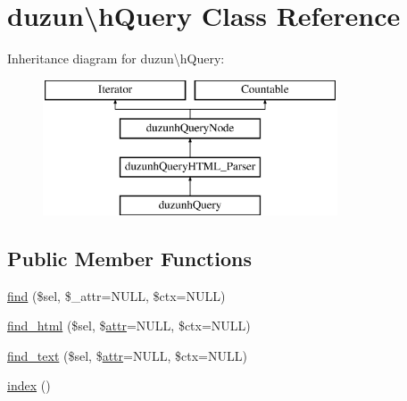 \hypertarget{classduzun_1_1hQuery}{}\section{duzun\textbackslash{}h\+Query Class Reference}
\label{classduzun_1_1hQuery}
Inheritance diagram for duzun\textbackslash{}h\+Query\+:\begin{figure}[H]
\begin{center}
\leavevmode
\includegraphics[height=4.000000cm]{classduzun_1_1hQuery}
\end{center}
\end{figure}
\subsection*{Public Member Functions}
\begin{DoxyCompactItemize}
\item 
\mbox{\hyperlink{classduzun_1_1hQuery_a3565bdeabc08bd32d10d365759e9dc82}{find}} (\$sel, \$\+\_\+attr=N\+U\+LL, \$ctx=N\+U\+LL)
\item 
\mbox{\hyperlink{classduzun_1_1hQuery_ac8332727e97405b17ecb4dd47c5a0fc9}{find\+\_\+html}} (\$sel, \$\mbox{\hyperlink{classduzun_1_1hQuery_1_1Node_a530ab9e8edeb1e876b369dcb321208c0}{attr}}=N\+U\+LL, \$ctx=N\+U\+LL)
\item 
\mbox{\hyperlink{classduzun_1_1hQuery_a3d00fababd6c54d00ee89a562233730d}{find\+\_\+text}} (\$sel, \$\mbox{\hyperlink{classduzun_1_1hQuery_1_1Node_a530ab9e8edeb1e876b369dcb321208c0}{attr}}=N\+U\+LL, \$ctx=N\+U\+LL)
\item 
\mbox{\hyperlink{classduzun_1_1hQuery_adf6b1bc1eb43a8e88effc0662e2edc49}{index}} ()
\end{DoxyCompactItemize}
